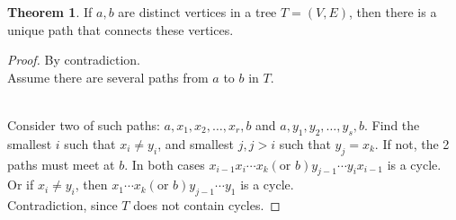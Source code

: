 \documentclass[letter]{book}
\theoremstyle{definition}
\newtheorem{theorem}{Theorem}[chapter]
\theoremstyle{definition}
\theoremstyle{remark}
\begin{document}
\begin{theorem}
    If $a,b$ are distinct vertices in a tree $T=(V,E)$, then there is a unique path that connects these vertices.
    \begin{proof}
        By contradiction.\\
        Assume there are several paths from $a$ to $b$ in $T$.\\
        \\
        Consider two of such paths: $a,x_1,x_2,\dots, x_r, b$ and $a, y_1,y_2,\ldots, y_s, b$. Find the smallest $i$ such that $x_i\neq y_i$, and smallest $j, j>i$ such that $y_j=x_k$. If not, the 2 paths must meet at $b$. In both cases $x_{i-1}x_i\cdots x_k (\text{or } b)y_{j-1}\cdots y_ix_{i-1}$ is a cycle.\\
        Or if $x_i\neq y_i$, then $x_1\cdots x_k (\text{or } b)y_{j-1}\cdots y_1$ is a cycle.\\
        Contradiction, since $T$ does not contain cycles.
    \end{proof}
\end{theorem}
\bigskip
\end{document}
